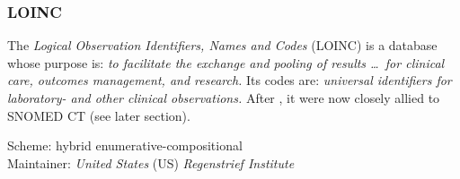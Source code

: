 %
%
%
%
%
%
%

\subsubsection{LOINC}
\label{loinc_heading}

The \emph{Logical Observation Identifiers, Names and Codes} (LOINC) is a
database whose purpose is: \textit{to facilitate the exchange and pooling of
results \ldots\ for clinical care, outcomes management, and research.} Its
codes are: \textit{universal identifiers for laboratory- and other clinical
observations.} \cite{loinc} After \cite{rogers}, it were now closely allied to
SNOMED CT (see later section).

Scheme: hybrid enumerative-compositional\\
Maintainer: \emph{United States} (US) \emph{Regenstrief Institute}
